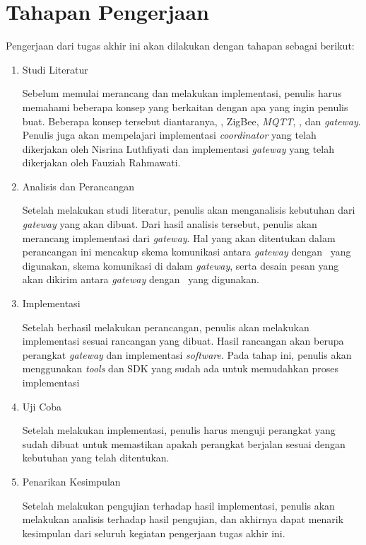 \section{Tahapan Pengerjaan}
Pengerjaan dari tugas akhir ini akan dilakukan dengan tahapan sebagai berikut:
\begin{enumerate}
	\item Studi Literatur
	
	Sebelum memulai merancang dan melakukan implementasi, penulis harus memahami beberapa konsep yang berkaitan dengan apa yang ingin penulis buat. Beberapa konsep tersebut diantaranya, \iot, ZigBee, \textit{MQTT}, \siot, dan \textit{gateway}. Penulis juga akan mempelajari implementasi \textit{coordinator} yang telah dikerjakan oleh Nisrina Luthfiyati\cite{SkripsiNina} dan implementasi \textit{gateway} yang telah dikerjakan oleh Fauziah Rahmawati\cite{SkripsiFarah}.
	\item Analisis dan Perancangan
	
	Setelah melakukan studi literatur, penulis akan menganalisis kebutuhan dari \textit{gateway} yang akan dibuat. Dari hasil analisis tersebut, penulis akan merancang implementasi dari \textit{gateway}. Hal yang akan ditentukan dalam perancangan ini mencakup skema komunikasi antara \textit{gateway} dengan \plat~yang digunakan, skema komunikasi di dalam \textit{gateway}, serta desain pesan yang akan dikirim antara \textit{gateway} dengan \plat~yang digunakan.
	\item Implementasi
	
	Setelah berhasil melakukan perancangan, penulis akan melakukan implementasi sesuai rancangan yang dibuat. Hasil rancangan akan berupa perangkat \textit{gateway} dan implementasi \textit{software}. Pada tahap ini, penulis akan menggunakan \textit{tools} dan SDK yang sudah ada untuk memudahkan proses implementasi
	\item Uji Coba
	
	Setelah melakukan implementasi, penulis harus menguji perangkat yang sudah dibuat untuk memastikan apakah perangkat berjalan sesuai dengan kebutuhan yang telah ditentukan.
	\item Penarikan Kesimpulan
	
	Setelah melakukan pengujian terhadap hasil implementasi, penulis akan melakukan analisis terhadap hasil pengujian, dan akhirnya dapat menarik kesimpulan dari seluruh kegiatan pengerjaan tugas akhir ini.
\end{enumerate}

